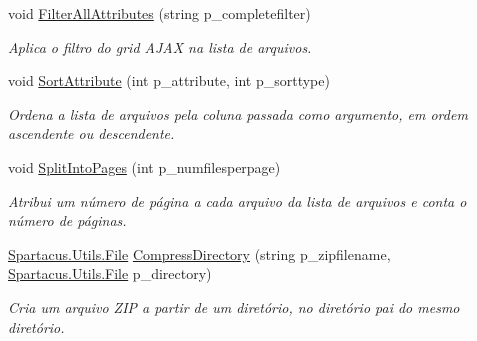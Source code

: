 \begin{DoxyCompactItemize}
void \hyperlink{classSpartacus_1_1Utils_1_1FileExplorer_a9f4f49e456a17be5e4051a79539b7459}{Filter\+All\+Attributes} (string p\+\_\+completefilter)
\begin{DoxyCompactList}\small\item\em Aplica o filtro do grid A\+J\+A\+X na lista de arquivos. \end{DoxyCompactList}\item 
void \hyperlink{classSpartacus_1_1Utils_1_1FileExplorer_a9d7be5225c56d655c107c0102c86ef12}{Sort\+Attribute} (int p\+\_\+attribute, int p\+\_\+sorttype)
\begin{DoxyCompactList}\small\item\em Ordena a lista de arquivos pela coluna passada como argumento, em ordem ascendente ou descendente. \end{DoxyCompactList}\item 
void \hyperlink{classSpartacus_1_1Utils_1_1FileExplorer_ad56f638a1f11734ca1157f1cdd39c7e7}{Split\+Into\+Pages} (int p\+\_\+numfilesperpage)
\begin{DoxyCompactList}\small\item\em Atribui um número de página a cada arquivo da lista de arquivos e conta o número de páginas. \end{DoxyCompactList}\item 
\hyperlink{classSpartacus_1_1Utils_1_1File}{Spartacus.\+Utils.\+File} \hyperlink{classSpartacus_1_1Utils_1_1FileExplorer_a698a5f476667204c0fbfad527371dca6}{Compress\+Directory} (string p\+\_\+zipfilename, \hyperlink{classSpartacus_1_1Utils_1_1File}{Spartacus.\+Utils.\+File} p\+\_\+directory)
\begin{DoxyCompactList}\small\item\em Cria um arquivo Z\+I\+P a partir de um diretório, no diretório pai do mesmo diretório. \end{DoxyCompactList}\end{DoxyCompactItemize}

